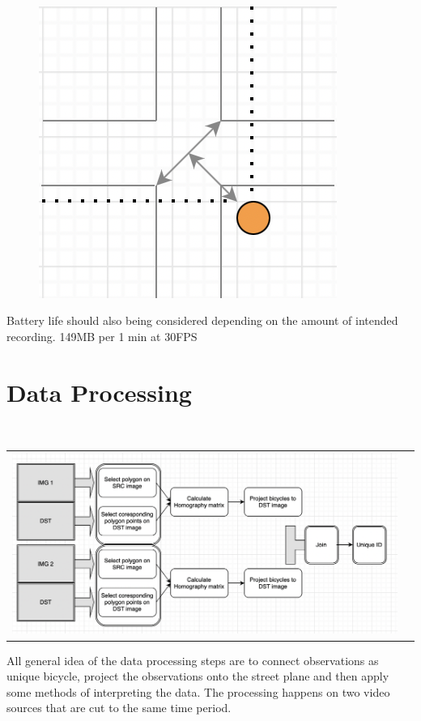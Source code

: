 \documentclass[
10pt, %
a4paper, %
oneside, %
headinclude,footinclude, %
] {book}%
\begin{document}
\ \\ 
  \begin{figure}[h]
    \includegraphics[scale=1.0]{location.png}
    \centering 
    \end{figure}
    \label{Camera location}

Battery life should also being considered depending on the amount of intended recording. 149MB per 1 min at 30FPS

\section{Data Processing}

\ \\ 
\noindent
\begin{tabular}{@{}cc}
\includegraphics[width=1.0\columnwidth]{data_flow.png} 
\end{tabular}
\label{data}


All general idea of the data processing steps are to connect observations as unique bicycle,
project the observations onto the street plane and then apply some methods of interpreting the data. The processing happens on two 
video sources that are cut to the same time period.
\ \\
\end{document}
